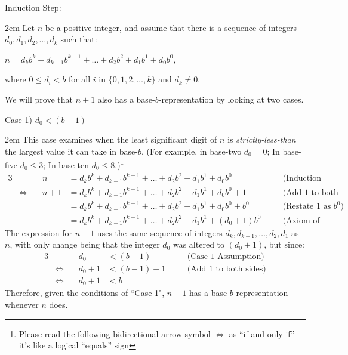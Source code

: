 \documentclass{article}
\newenvironment{jprIn}{\begin{adjustwidth}{2em}{}}{\end{adjustwidth}}
\begin{document}
\bigskip
Induction Step:
\begin{jprIn}
Let $n$ be a positive integer, and assume that
there is a sequence
of integers $d_0, d_1, d_2,\dots{},d_k$ such that:

\hspace{3em}$n=d_kb^k+d_{k-1}b^{k-1}+\dots+d_2b^2+d_1b^1+d_0b^0$,

where $0\le{}d_i<b$ for all $i$ in $\{0,1,2,\dots{},k\}$ and $d_k\ne0$.

We will prove that $n+1$ also has a
base-$b$-representation by looking at two cases.

\bigskip
Case 1) $d_0<(b-1)$
\begin{jprIn}
This case examines when the least significant
digit of $n$ is \emph{strictly-less-than} the largest value it can take in base-$b$.
(For example, in base-two $d_0 = 0$;
In base-five $d_0\le{}3$;
In base-ten $d_0\le{}8$.)\footnote{Please read the following
bidirectional arrow symbol $\Leftrightarrow$
as ``if and only if'' - it's like a logical ``equals'' sign}
{\small
\begin{alignat*}{3}
  &&n
  &= d_kb^k+d_{k-1}b^{k-1}+\dots+d_2b^2+d_1b^1+d_0b^0 &&\quad\text{(Induction Assumption)}\\
  &\Leftrightarrow\quad
  &n+1
  &= d_kb^k+d_{k-1}b^{k-1}+\dots+d_2b^2+d_1b^1+d_0b^0 + 1 &&\quad\text{(Add 1 to both sides)}\\  
  &&&= d_kb^k+d_{k-1}b^{k-1}+\dots+d_2b^2+d_1b^1+d_0b^0 + b^0 &&\quad\text{(Restate 1 as }b^0\text{)}\\
  &&&= d_kb^k+d_{k-1}b^{k-1}+\dots+d_2b^2+d_1b^1 + (d_0+1)b^0 &&\quad\text{(Axiom of Distribution)}
\end{alignat*}
}The expression for $n+1$ uses the same sequence of
integers $d_k, d_{k-1},\dots{},d_2,d_1$ as $n$, with only
change being that the integer $d_0$ was altered to $(d_0{+}1)$, but since:
\begin{alignat*}{3}
  &&d_0
  &< (b-1) &&\quad\text{(Case 1 Assumption)}\\
  &\Leftrightarrow\quad
  &d_0+1
  &< (b-1)+1 &&\quad\text{(Add 1 to both sides)}\\  
  &\Leftrightarrow\quad
  &d_0+1
  &< b
\end{alignat*}
Therefore, given the conditions of ``Case 1", $n+1$ has a base-$b$-representation whenever $n$ does.
\end{jprIn}


\end{jprIn}
\end{document}
